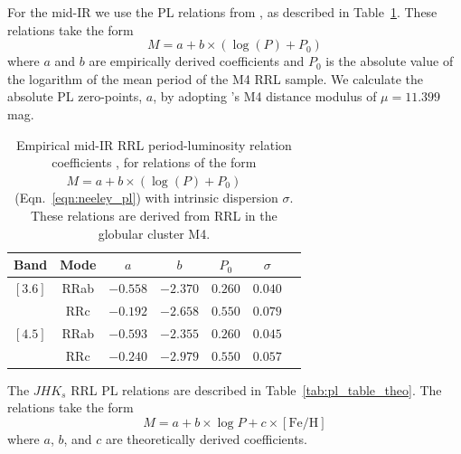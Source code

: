 \documentclass[a4paper,fleqn,usenatbib]{mnras}
\begin{document}
For the mid-IR we use the PL relations from \citet{2015ApJ...808...11N}, as described in Table~\ref{tab:pl_table_m4}. These relations take the form
\begin{equation}
\label{eqn:neeley_pl}
M = a + b \times (\log (P) + P_0) 
\end{equation}
where $a$ and $b$ are empirically derived coefficients and $P_0$ is the absolute value of the logarithm of the mean period of the M4 RRL sample. We calculate the absolute PL zero-points, $a$, by adopting \citeauthor{2015ApJ...808...11N}'s M4 distance modulus of $\mu=11.399$ mag.


\begin{table}
\centering
\caption{Empirical mid-IR RRL period-luminosity relation coefficients \citep{2015ApJ...808...11N}, for relations of the form ${M = a + b \times (\log (P) + P_0)}$ (Eqn.~\ref{eqn:neeley_pl}) with intrinsic dispersion $\sigma$. These relations are derived from RRL in the globular cluster M4.} 
\label{tab:pl_table_m4}
\begin{tabular}{l||c|c|c|c|c|r} 
\hline \hline
Band & Mode & $a$ & $b$ & $P_0$ & $\sigma$ \\
\hline
$[3.6]$ & RRab & $-0.558$ & $-2.370$ & $0.260$ & $0.040$ \\
            & RRc & $-0.192$ & $-2.658$ & $0.550$ & $0.079$ \\
$[4.5]$ & RRab & $-0.593$ & $-2.355$ & $0.260$ & $0.045$ \\
            & RRc & $-0.240$ & $-2.979$ & $0.550$ & $0.057$ \\ 
            \hline
\end{tabular}
\end{table}

The $JHK_s$ RRL PL relations are described in Table~\ref{tab:pl_table_theo}. The relations take the form
\begin{equation}
\label{eqn:marconi_pl}
M = a + b\times\log P + c\times[\text{Fe/H}]
\end{equation}
where $a$, $b$, and $c$ are theoretically derived coefficients.
\end{document}
